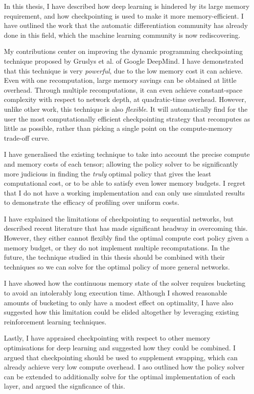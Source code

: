 In this thesis, I have described how deep learning is hindered by its large memory requirement, and how checkpointing is used to make it more memory-efficient.
I have outlined the work that the automatic differentiation community has already done in this field, which the machine learning community is now rediscovering.

My contributions center on improving the dynamic programming checkpointing technique proposed by Gruslys et al. of Google DeepMind.
I have demonstrated that this technique is very \textit{powerful}, due to the low memory cost it can achieve.
Even with one recomputation, large memory savings can be obtained at little overhead.
Through multiple recomputations, it can even achieve constant-space complexity with respect to network depth, at quadratic-time overhead.
However, unlike other work, this technique is also \textit{flexible}.
It will automatically find for the user the most computationally efficient checkpointing strategy that recomputes as little as possible, rather than picking a single point on the compute-memory trade-off curve.

I have generalised the existing technique to take into account the precise compute and memory costs of each tensor;
allowing the policy solver to be significantly more judicious in finding the \textit{truly} optimal policy that gives the least computational cost, or to be able to satisfy even lower memory budgets.
I regret that I do not have a working implementation and can only use simulated results to demonstrate the efficacy of profiling over uniform costs.

I have explained the limitations of checkpointing to sequential networks, but described recent literature that has made significant headway in overcoming this.
However, they either cannot flexibly find the optimal compute cost policy given a memory budget, or they do not implement multiple recomputations.
In the future, the technique studied in this thesis should be combined with their techniques so we can solve for the optimal policy of more general networks.

I have showed how the continuous memory state of the solver requires bucketing to avoid an intolerably long execution time.
Although I showed reasonable amounts of bucketing to only have a modest effect on optimality, I have also suggested how this limitation could be elided altogether by leveraging existing reinforcement learning techniques.

Lastly, I have appraised checkpointing with respect to other memory optimisations for deep learning and suggested how they could be combined.
I argued that checkpointing should be used to supplement swapping, which can already achieve very low compute overhead.
I aso outlined how the policy solver can be extended to additionally solve for the optimal implementation of each layer, and argued the signficance of this.

